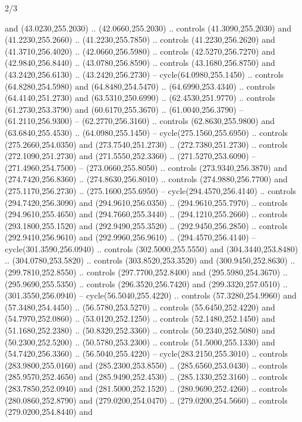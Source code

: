 \begin{flagdescription}{2/3}
\begin{scope}[xshift=0.5\flaglength,yshift=0.5\flagwidth,scale=\stretchfactor]
\begin{scope}[scale=0.001645\flagwidth,yshift=65mm,xshift=-63mm]
\begin{scope}[y=0.80pt, x=0.80pt, yscale=-1,]
\begin{scope}[cm={{1.33333,0.0,0.0,1.33333,(0.0,1e-05)}}]
  and (43.0230,255.2030) .. (42.0660,255.2030) .. controls (41.3090,255.2030)
  and (41.2230,255.2660) .. (41.2230,255.7850) .. controls (41.2230,256.2620)
  and (41.3710,256.4020) .. (42.0660,256.5980) .. controls (42.5270,256.7270)
  and (42.9840,256.8440) .. (43.0780,256.8590) .. controls (43.1680,256.8750)
  and (43.2420,256.6130) .. (43.2420,256.2730) -- cycle(64.0980,255.1450) ..
  controls (64.8280,254.5980) and (64.8480,254.5470) .. (64.6990,253.4340) ..
  controls (64.4140,251.2730) and (63.5310,250.6990) .. (62.4530,251.9770) ..
  controls (61.2730,253.3790) and (60.6170,255.3670) .. (61.0040,256.3790) --
  (61.2110,256.9300) -- (62.2770,256.3160) .. controls (62.8630,255.9800) and
  (63.6840,255.4530) .. (64.0980,255.1450) -- cycle(275.1560,255.6950) ..
  controls (275.2660,254.0350) and (273.7540,251.2730) .. (272.7380,251.2730) ..
  controls (272.1090,251.2730) and (271.5550,252.3360) .. (271.5270,253.6090) --
  (271.4960,254.7500) -- (273.0660,255.8050) .. controls (273.9340,256.3870) and
  (274.7420,256.8360) .. (274.8630,256.8010) .. controls (274.9880,256.7700) and
  (275.1170,256.2730) .. (275.1600,255.6950) -- cycle(294.4570,256.4140) ..
  controls (294.7420,256.3090) and (294.9610,256.0350) .. (294.9610,255.7970) ..
  controls (294.9610,255.4650) and (294.7660,255.3440) .. (294.1210,255.2660) ..
  controls (293.1800,255.1520) and (292.9490,255.3520) .. (292.9450,256.2850) ..
  controls (292.9410,256.9610) and (292.9960,256.9610) .. (294.4570,256.4140) --
  cycle(301.3590,256.0940) .. controls (302.5000,255.5550) and
  (304.3440,253.8480) .. (304.0780,253.5820) .. controls (303.8520,253.3520) and
  (300.9450,252.8630) .. (299.7810,252.8550) .. controls (297.7700,252.8400) and
  (295.5980,254.3670) .. (295.9690,255.5350) .. controls (296.3520,256.7420) and
  (299.3320,257.0510) .. (301.3550,256.0940) -- cycle(56.5040,255.4220) ..
  controls (57.3280,254.9960) and (57.3480,254.4450) .. (56.5780,253.5270) ..
  controls (55.6450,252.4220) and (54.7970,252.0860) .. (53.0120,252.1250) ..
  controls (52.1480,252.1450) and (51.1680,252.2380) .. (50.8320,252.3360) ..
  controls (50.2340,252.5080) and (50.2300,252.5200) .. (50.5780,253.2300) ..
  controls (51.5000,255.1330) and (54.7420,256.3360) .. (56.5040,255.4220) --
  cycle(283.2150,255.3010) .. controls (283.9800,255.0160) and
  (285.2300,253.8550) .. (285.6560,253.0430) .. controls (285.9570,252.4650) and
  (285.9490,252.4530) .. (285.1330,252.3160) .. controls (283.7850,252.0940) and
  (281.5000,252.1520) .. (280.9690,252.4260) .. controls (280.0860,252.8790) and
  (279.0200,254.0470) .. (279.0200,254.5660) .. controls (279.0200,254.8440) and

\end{scope}
\end{scope}
\end{scope}
\end{scope}
\end{flagdescription}
